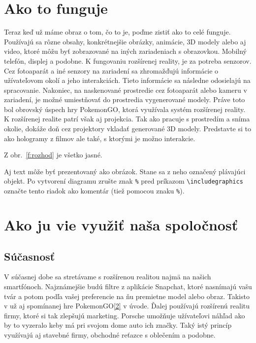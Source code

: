 \documentclass[10pt,twoside,a4paper]{article}
\begin{document}
\section{Ako to funguje}\label{ako}

Teraz keď už máme obraz o tom, čo to je, poďme zistiť ako to celé funguje. Používajú sa rôzne obsahy, konkrétnejšie obrázky, animácie, 3D modely alebo aj video, ktoré môžu byť zobrazované na iných zariadeniach  s obrazovkou. Mobilný telefón, displej a podobne. K fungovaniu rozšírenej reality, je za potreba senzorov. Cez fotoaparát a iné senzory na zariadení sa zhromažďujú informácie o užívateľovom okolí a jeho interakciách. Tieto informácie sa následne odosielajú na spracovanie. Nakoniec, na naskenované prostredie cez fotoaparát alebo kameru v zariadení, je možné umiestňovať do prostredia vygenerované modely. Práve toto bol obrovský úspech hry PokemonGO, ktorá využívala systém rozšírenej reality. K rozšírenej realite patrí však aj projekcia. Tak ako pracuje s prostredím a sníma okolie, dokáže doň cez projektory vkladať generované 3D modely. Predstavte si to ako hologramy z filmov ale také, s ktorými je možno interakcie.

Z obr.~\ref{f:rozhod} je všetko jasné. 

\begin{figure*}[tbh]
\centering
Aj text môže byť prezentovaný ako obrázok. Stane sa z neho označený plávajúci objekt. Po vytvorení diagramu zrušte znak \texttt{\%} pred príkazom \verb|\includegraphics| označte tento riadok ako komentár (tiež pomocou znaku \texttt{\%}).
\caption{Rozhodujúci argument.}
\label{f:rozhod}
\end{figure*}



\section{Ako ju vie využiť naša spoločnosť} \label{vyuzitie}
\subsection{Súčasnosť}\label{vyuzitie:suc}
V súčasnej dobe sa stretávame s rozšírenou realitou najmä na našich smartfónoch. Najznámejšie budú filtre z aplikácie Snapchat, ktoré nasnímajú vašu tvár a potom podľa vašej preferencie na ňu premietne model alebo obraz. Takisto v už aj spomínanej hre PokemonGO\ref{2} v úvode. Ďalej používajú rozšírenú realitu firmy, ktoré si tak zlepšujú marketing. Porsche umožňuje užívateľovi náhľad ako by to vyzeralo keby má pri svojom dome auto ich značky. Taký istý princíp využívajú aj stavebné firmy, obchodné reťazce s oblečením a podobne.
\end{document}
